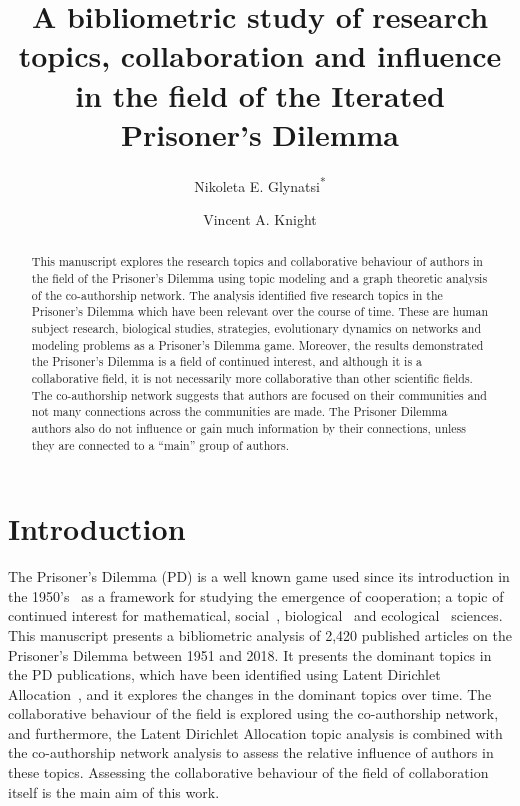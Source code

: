 \documentclass{article}
\title{A bibliometric study of research topics, collaboration and influence in
the field of the Iterated Prisoner's Dilemma}
\author[1]{Nikoleta E. Glynatsi\textsuperscript{*}}
\author[1]{Vincent A. Knight}
\affil[1]{Cardiff University, School of Mathematics, Cardiff, United Kingdom}
\date{}
\theoremstyle{definition}
\begin{document}
\maketitle

\begin{abstract}
This manuscript explores the research topics and collaborative behaviour of
authors in the field of the Prisoner's Dilemma using topic modeling and a graph
theoretic analysis of the co-authorship network. The analysis identified five
research topics in the Prisoner's Dilemma which have been relevant over the course
of time. These are human subject research, biological studies, strategies,
evolutionary dynamics on networks and modeling problems as a Prisoner's Dilemma
game. Moreover, the results demonstrated the Prisoner's Dilemma is a field of
continued interest, and although it is a collaborative field, it is not
necessarily more collaborative than other scientific fields. The co-authorship
network suggests that authors are focused on their communities and not many
connections across the communities are made. The Prisoner Dilemma authors also
do not influence or gain much information by their connections, unless they are
connected to a ``main'' group of authors.
\end{abstract}

\section{Introduction}\label{section:introduction}

The Prisoner's Dilemma (PD) is a well known game used since its introduction in
the 1950's~\cite{Flood1958} as a framework for studying the emergence of
cooperation; a topic of continued interest for mathematical,
social~\cite{Perc2008}, biological~\cite{Turner1999} and
ecological~\cite{Wu2011} sciences. This manuscript presents a bibliometric
analysis of 2,420 published articles on the Prisoner's Dilemma between 1951 and
2018. It presents the dominant topics in the PD publications, which have been
identified using Latent Dirichlet Allocation~\cite{Blei2003}, and it explores the changes in the
dominant topics over time. The collaborative behaviour of the field is explored
using the co-authorship network, and furthermore, the Latent Dirichlet
Allocation topic analysis is combined with the co-authorship network analysis to assess
the relative influence of authors in these topics. Assessing the collaborative
behaviour of the field of collaboration itself is the main aim of this work.
\end{document}
